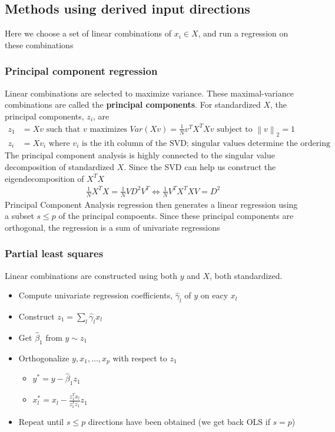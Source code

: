 \documentclass{article}
\newcommand{\norm}[2]{\left\lVert#1\right\rVert_#2}
\begin{document}
\subsection{Methods using derived input directions}
Here we choose a set of linear combinations of $x_i \in X$, and run a regression on these combinations
\subsubsection{Principal component regression}
Linear combinations are selected to maximize variance. These maximal-variance combinations are called the \textbf{principal components}. For standardized $X$, the principal components, $z_i$, are
\begin{align*}
  z_1 &= Xv \textrm{ such that $v$ maximizes } Var(Xv) = \frac{1}{N}v^TX^TXv \textrm{ subject to } \norm{v}{2} = 1\\
  z_i &= Xv_i \textrm{ where $v_i$ is the ith column of the SVD; singular values determine the ordering}
\end{align*}
The principal component analysis is highly connected to the singular value decomposition of standardized $X$. Since the SVD can help us construct the eigendecomposition of $X^TX$
\begin{align*}
  \frac{1}{N}X^TX = \frac{1}{N}VD^2V^T \Longleftrightarrow \frac{1}{N}V^TX^TXV = D^2
\end{align*}
Principal Component Analysis regression then generates a linear regression using a subset $s \leq p$ of the principal compoents. Since these principal components are orthogonal, the regression is a sum of univariate regressions

\subsubsection{Partial least squares}
Linear combinations are constructed using both $y$ and $X$, both standardized. 
\begin{itemize}
  \item Compute univariate regression coefficients, $\hat{\gamma}_l$ of $y$ on eacy $x_l$
  \item Construct $z_1 = \sum_l\hat{\gamma}_lx_l$
  \item Get $\hat{\beta}_1$ from $y \sim z_1$
  \item Orthogonalize $y, x_1, \dots, x_p$ with respect to $z_1$
  \begin{itemize}
    \item $y^* = y - \hat{\beta}_1z_1$
    \item $x^*_l = x_l - \frac{z_1^Tx_l}{z_1^Tz_1}z_1$
  \end{itemize}
  \item Repeat until $s \leq p$ directions have been obtained (we get back OLS if $s = p$)
\end{itemize}
\end{document}
